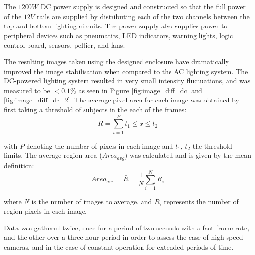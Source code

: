 \documentclass[fleqn,twoside,12pt]{report}
\begin{document}
The $1200W$ DC power supply is designed and constructed so that the full power of the $12V$ rails are supplied by distributing each of the two channels between the top and bottom lighting circuits. The power supply also supplies power to peripheral devices such as pneumatics, LED indicators, warning lights, logic control board, sensors, peltier, and fans.

The resulting images taken using the designed enclosure have dramatically improved the image stabilisation when compared to the AC lighting system. The DC-powered lighting system resulted in very small intensity fluctuations, and was measured to be $<0.1\%$ as seen in Figure \ref{fig:image_diff_dc} and \ref{fig:image_diff_dc_2}. The average pixel area for each image was obtained by first taking a threshold of subjects in the each of the frames:
\begin{equation}
R = \sum_{i=1}^{P}t_1 \leq x \leq t_2
\end{equation}

with $P$ denoting the number of pixels in each image and $t_1$, $t_2$ the threshold limits. The average region area ($Area_{avg}$) was calculated and is given by the mean definition:
\begin{equation}
Area_{avg} = \bar{R} = \frac{1}{N}\sum_{i=1}^{N}R_i
\end{equation}

where $N$ is the number of images to average, and $R_i$ represents the number of region pixels in each image.

Data was gathered twice, once for a period of two seconds with a fast frame rate, and the other over a three hour period in order to assess the case of high speed cameras, and in the case of constant operation for extended periods of time.
\end{document}
